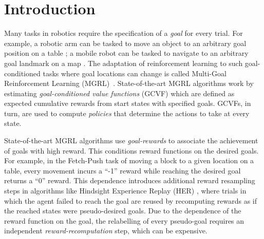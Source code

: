 \section{Introduction}

Many tasks in robotics require the specification of a \emph{goal} for every
trial. For example, a robotic arm can be tasked to move an object to an arbitrary
goal position on a table \citep{gu2017deep}; a mobile robot can be
tasked to navigate to an arbitrary goal landmark on a map \citep{zhu2017target}. The
adaptation of reinforcement learning to such goal-conditioned tasks where goal
locations can change is called Multi-Goal Reinforcement Learning
(MGRL)~\citep{plappert2018multi}.
State-of-the-art MGRL algorithms
\citep{andrychowicz2017hindsight, pong2018temporal}
work by estimating \emph{goal-conditioned value functions} (GCVF) which
are defined as expected cumulative rewards from 
start states with specified goals. GCVFs, in turn, are used to compute
\emph{policies} that determine the actions to take at every state.


State-of-the-art MGRL algorithms use \emph{goal-rewards} to associate
the achievement of goals with high reward.
This conditions reward functions on the desired goals.
For example, in the Fetch-Push task \citep{plappert2018multi} of moving
a block to a given location on a table, every movement incurs a ``-1''
reward while reaching the desired goal returns a ``0'' reward. 
This dependence introduces additional reward resampling steps in
algorithms like Hindsight Experience Replay (HER)
\citep{andrychowicz2017hindsight}, where
trials in which the agent failed to reach the goal are reused by recomputing
rewards as if the reached states were pseudo-desired goals.
Due to the dependence of the reward function on the goal,
the relabelling of every pseudo-goal requires an independent
\emph{reward-recomputation} step, which can be expensive. 



